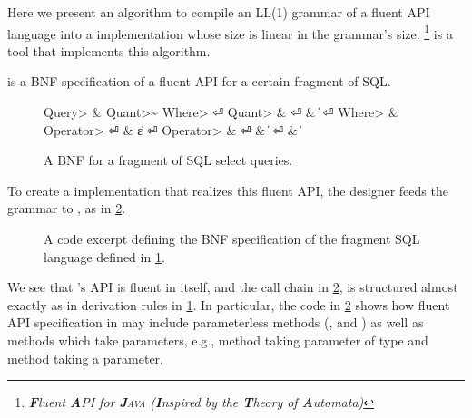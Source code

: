 Here we present an algorithm to compile an LL(1) grammar of a fluent API
language into a \Java implementation whose size is linear in the grammar's
size. \Fajita 
\Fajita\footnote{\itshape \textbf Fluent \textbf API for 
    \textsc{\textbf Java} 
    (\textbf Inspired by the \textbf Theory of \textbf Automata)
  }
is a \Java tool that implements this algorithm.

 is a BNF specification of a fluent API for a certain
fragment of SQL.

\begin{figure}[H]
  \caption{\label{figure:sql-bnf}
    A BNF for a fragment of SQL select queries.
  }
  \begin{Grammar}
    \begin{aligned}
      \<Query>    & \Derives {} \<Quant>\~ \<Where> \hfill⏎
      \<Quant>    & \Derives {} \hfill⏎
                  & \|  \hfill⏎
      \<Where>    & \Derives {}  \<Operator> \hfill⏎
                  & \|ε \hfill⏎
      \<Operator> & \Derives {}\hfill⏎
                  & \|  \hfill⏎
                  & \| \hfill
    \end{aligned}
  \end{Grammar}
\end{figure}

To create a \Java implementation that realizes this fluent API,
  the designer feeds the grammar to \Fajita, as in  
  \cref{figure:sql-bnf-java}.

\begin{figure}[H]
  \caption{\label{figure:sql-bnf-java}
    A \Java code excerpt defining the BNF specification of the fragment SQL
    language defined in \cref{figure:sql-bnf}.}
\end{figure}

We see that \Fajita's API is fluent in itself, and the 
  call chain in \cref{figure:sql-bnf-java}, is structured almost
  exactly as in derivation rules in \cref{figure:sql-bnf}.
In particular, the code in \cref{figure:sql-bnf-java} shows how fluent API specification in \Fajita
  may include parameterless methods (,  and ) as well as methods which 
  take parameters, e.g., method  taking parameter of type  and 
    method  taking a  parameter.

